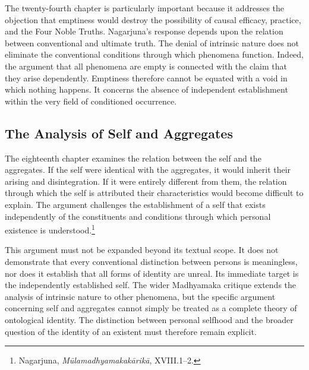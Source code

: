 
\label{para:VS.B01.P01.C08.S18.SS07.P002}
The twenty-fourth chapter is particularly important because it addresses the objection that emptiness would destroy the possibility of causal efficacy, practice, and the Four Noble Truths. Nagarjuna's response depends upon the relation between conventional and ultimate truth. The denial of intrinsic nature does not eliminate the conventional conditions through which phenomena function. Indeed, the argument that all phenomena are empty is connected with the claim that they arise dependently. Emptiness therefore cannot be equated with a void in which nothing happens. It concerns the absence of independent establishment within the very field of conditioned occurrence.

\subsection{The Analysis of Self and Aggregates}
\label{subsec:ch08_s18_ss08}

\label{para:VS.B01.P01.C08.S18.SS08.P001}
The eighteenth chapter examines the relation between the self and the aggregates. If the self were identical with the aggregates, it would inherit their arising and disintegration. If it were entirely different from them, the relation through which the self is attributed their characteristics would become difficult to explain. The argument challenges the establishment of a self that exists independently of the constituents and conditions through which personal existence is understood.\footnote{Nagarjuna, \emph{M\={u}lamadhyamakak\={a}rik\={a}}, XVIII.1--2.}


\label{para:VS.B01.P01.C08.S18.SS08.P002}
This argument must not be expanded beyond its textual scope. It does not demonstrate that every conventional distinction between persons is meaningless, nor does it establish that all forms of identity are unreal. Its immediate target is the independently established self. The wider Madhyamaka critique extends the analysis of intrinsic nature to other phenomena, but the specific argument concerning self and aggregates cannot simply be treated as a complete theory of ontological identity. The distinction between personal selfhood and the broader question of the identity of an existent must therefore remain explicit.

